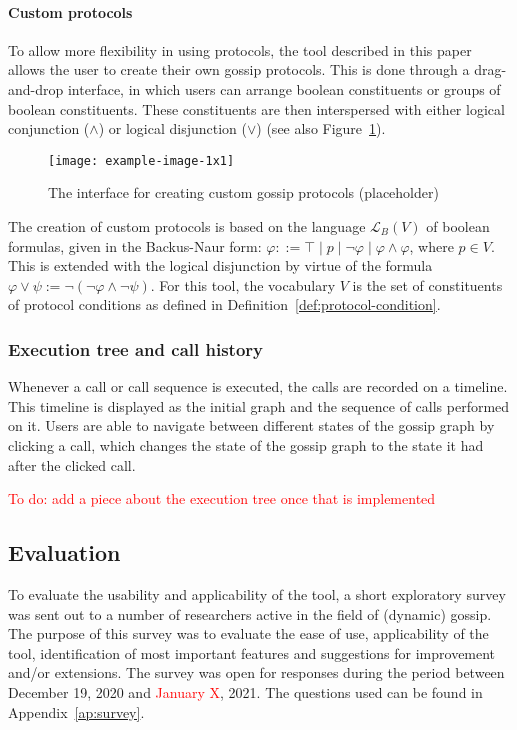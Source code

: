 \paragraph{Custom protocols}
\label{sec:custom-protocols}
To allow more flexibility in using protocols, 
the tool described in this paper allows the user to create their own gossip protocols.
This is done through a drag-and-drop interface,
in which users can arrange boolean constituents or groups of boolean constituents.
These constituents are then interspersed with either logical conjunction (\(\land\)) or logical disjunction (\(\lor\)) (see also Figure~\ref{fig:protocol-creator}).

\begin{figure}[htb!]
    \centering
    \texttt{[image: example-image-1x1]}
    \caption{The interface for creating custom gossip protocols (placeholder)}
    \label{fig:protocol-creator}
\end{figure}

The creation of custom protocols is based on the language \(\mathcal{L}_B(V)\) of boolean formulas, 
given in the Backus-Naur form:
\(\varphi ::= \top \mid p \mid \neg \varphi \mid \varphi \land \varphi\), where \(p \in V\). This is extended with the logical disjunction by virtue of the formula \(\varphi \lor \psi := \neg(\neg\varphi \land \neg\psi)\).
For this tool, the vocabulary \(V\) is the set of constituents of protocol conditions as defined in Definition~\ref{def:protocol-condition}.

\subsubsection{Execution tree and call history}

Whenever a call or call sequence is executed, the calls are recorded on a timeline.
This timeline is displayed as the initial graph and the sequence of calls performed on it.
Users are able to navigate between different states of the gossip graph by clicking a call,
which changes the state of the gossip graph to the state it had after the clicked call.

\textcolor{red}{To do: add a piece about the execution tree once that is implemented}

\subsection{Evaluation}

To evaluate the usability and applicability of the tool,
a short exploratory survey was sent out to a number of researchers active in the field of (dynamic) gossip.
The purpose of this survey was to evaluate the ease of use,
applicability of the tool,
identification of most important features and suggestions for improvement and/or extensions.
The survey was open for responses during the period between December 19, 2020 and \textcolor{red}{January X}, 2021.
The questions used can be found in Appendix~\ref{ap:survey}.